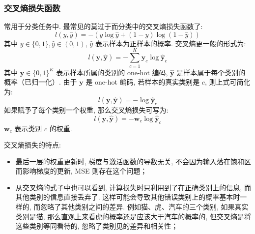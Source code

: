 \subsubsection{交叉熵损失函数}
常用于分类任务中. 最常见的莫过于而分类中的交叉熵损失函数了: 
$$
l(y, \hat{y}) = -(y \log \hat{y} + (1-y) \log (1-\hat{y}))
$$
其中 $y \in \{0, 1\}, \hat{y} \in (0, 1)$, $\hat y$ 表示样本为正样本的概率. 交叉熵更一般的形式为: 
$$
l(\boldsymbol{y}, \hat{\boldsymbol{y}}) = - \sum_{c=1}^K \boldsymbol{y}_c \log \hat{\boldsymbol{y}}_c
$$
其中 $\boldsymbol{y} \in \{0,1\}^K$ 表示样本所属的类别的 one-hot 编码, $\hat{\boldsymbol{y}}$ 是样本属于每个类别的概率（已归一化）. 由于 $\boldsymbol{y}$ 是 one-hot 编码, 若样本的真实类别是 $c$, 则上式可简化为: 
$$
l(\boldsymbol{y}, \hat{\boldsymbol{y}}) = - \log \hat{\boldsymbol{y}}_c
$$
如果赋予了每个类别一个权重, 那么交叉熵损失可写为: 
$$
l(\boldsymbol{y}, \hat{\boldsymbol{y}}) = - \boldsymbol{w}_c\log \hat{\boldsymbol{y}}_c
$$
$\boldsymbol{w}_c$ 表示类别 $c$ 的权重. 

交叉熵损失的特点: 
\begin{itemize}
	\item 最后一层的权重更新时, 梯度与激活函数的导数无关, 不会因为输入落在饱和区而影响梯度的更新, MSE 则存在这个问题；
	
	\item 从交叉熵的式子中也可以看到, 计算损失时只利用到了在正确类别上的信息, 而其他类别的信息直接丢弃了. 这样可能会导致其他错误类别上的概率基本时一样的, 而忽略了其他类别之间的差异. 例如猫、虎、汽车的三个类别, 如果真实类别是猫, 那么直观上来看虎的概率还是应该大于汽车的概率的, 但交叉熵是将这些类别等同看待的, 忽略了类别见的差异和相关性；	
\end{itemize}

